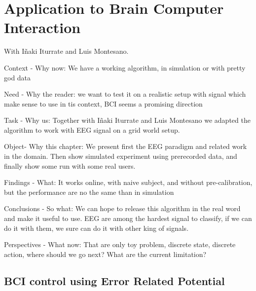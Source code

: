 \renewcommand{\chapterpath}{\allchapterspath/bci}
\renewcommand{\imgpath}{\chapterpath/img}

\chapter{Application to Brain Computer Interaction}
\label{chapter:bci}
\minitoc

With I\~naki Iturrate and Luis Montesano.

Context - Why now: We have a working algorithm, in simulation or with pretty god data

Need - Why the reader: we want to test it on a realistic setup with signal which make sense to use in tis context, BCI seems a promising direction

Task - Why us: Together with I\~naki Iturrate and Luis Montesano we adapted the algorithm to work with EEG signal on a grid world setup.

Object- Why this chapter:  We present first the EEG paradigm and related work in the domain. Then show simulated experiment using prerecorded data, and finally show some run with some real users.

Findings - What: It works online, with naive subject, and without pre-calibration, but the performance are no the same than in simulation

Conclusions - So what: We can hope to release this algorithm in the real word and make it useful to use. EEG are among the hardest signal to classify, if we can do it with them, we sure can do it with other king of signals.

Perspectives - What now: That are only toy problem, discrete state, discrete action, where should we go next? What are the current limitation?

\section{BCI control using Error Related Potential}



